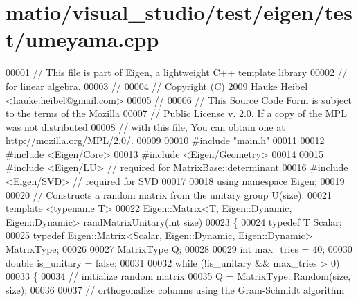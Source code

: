 \hypertarget{matio_2visual__studio_2test_2eigen_2test_2umeyama_8cpp_source}{}\section{matio/visual\+\_\+studio/test/eigen/test/umeyama.cpp}
\label{matio_2visual__studio_2test_2eigen_2test_2umeyama_8cpp_source}

\begin{DoxyCode}
00001 \textcolor{comment}{// This file is part of Eigen, a lightweight C++ template library}
00002 \textcolor{comment}{// for linear algebra.}
00003 \textcolor{comment}{//}
00004 \textcolor{comment}{// Copyright (C) 2009 Hauke Heibel <hauke.heibel@gmail.com>}
00005 \textcolor{comment}{//}
00006 \textcolor{comment}{// This Source Code Form is subject to the terms of the Mozilla}
00007 \textcolor{comment}{// Public License v. 2.0. If a copy of the MPL was not distributed}
00008 \textcolor{comment}{// with this file, You can obtain one at http://mozilla.org/MPL/2.0/.}
00009 
00010 \textcolor{preprocessor}{#include "main.h"}
00011 
00012 \textcolor{preprocessor}{#include <Eigen/Core>}
00013 \textcolor{preprocessor}{#include <Eigen/Geometry>}
00014 
00015 \textcolor{preprocessor}{#include <Eigen/LU>} \textcolor{comment}{// required for MatrixBase::determinant}
00016 \textcolor{preprocessor}{#include <Eigen/SVD>} \textcolor{comment}{// required for SVD}
00017 
00018 \textcolor{keyword}{using namespace }\hyperlink{namespace_eigen}{Eigen};
00019 
00020 \textcolor{comment}{//  Constructs a random matrix from the unitary group U(size).}
00021 \textcolor{keyword}{template} <\textcolor{keyword}{typename} T>
00022 \hyperlink{group___core___module_class_eigen_1_1_matrix}{Eigen::Matrix<T, Eigen::Dynamic, Eigen::Dynamic>} 
      randMatrixUnitary(\textcolor{keywordtype}{int} size)
00023 \{
00024   \textcolor{keyword}{typedef} \hyperlink{group___sparse_core___module}{T} Scalar;
00025   \textcolor{keyword}{typedef} \hyperlink{group___core___module_class_eigen_1_1_matrix}{Eigen::Matrix<Scalar, Eigen::Dynamic, Eigen::Dynamic>}
       MatrixType;
00026 
00027   MatrixType Q;
00028 
00029   \textcolor{keywordtype}{int} max\_tries = 40;
00030   \textcolor{keywordtype}{double} is\_unitary = \textcolor{keyword}{false};
00031 
00032   \textcolor{keywordflow}{while} (!is\_unitary && max\_tries > 0)
00033   \{
00034     \textcolor{comment}{// initialize random matrix}
00035     Q = MatrixType::Random(size, size);
00036 
00037     \textcolor{comment}{// orthogonalize columns using the Gram-Schmidt algorithm}

\end{DoxyCode}
